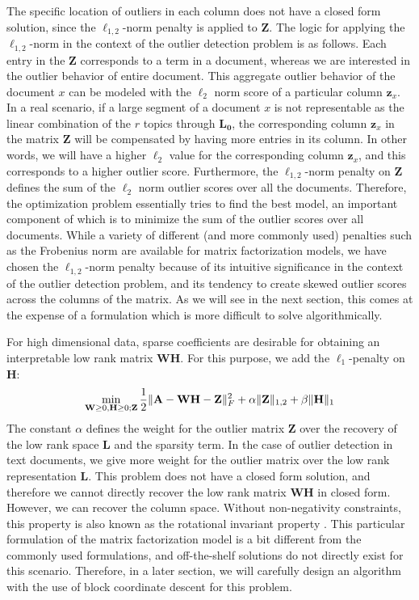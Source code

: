 The specific location of outliers in each column does not have a
closed form solution, since the $\ell_{1,2}$-norm penalty is applied
to $\mathbf{Z}$.   The   logic for applying the $\ell_{1,2}$-norm in
the context of the outlier detection problem is as follows.  Each
entry in the $\mathbf{Z}$ corresponds to a term in a document,
whereas we are interested in the outlier behavior of entire
document. This aggregate outlier behavior of the document $x$ can
be modeled with the $\ell_2$ norm score of a particular column
$\mathbf{z}_x$. In a real scenario,  if a large segment  of a
document $x$ is not representable as the linear combination of the
$r$ topics through $\mathbf{L_0}$, the corresponding column
$\mathbf{z}_x$ in the matrix $\mathbf{Z}$ will be compensated by
having more entries in its column.  In other words, we will  have a
higher $\ell_2$ value for the corresponding column $\mathbf{z}_x$,
and this corresponds to a higher outlier score.
 Furthermore, the  $\ell_{1,2}$-norm penalty on $\mathbf{Z}$
defines the sum of the $\ell_2$ norm outlier scores over all the
documents.  Therefore,  the optimization problem essentially tries
to find the best model,  an important component of which is to
minimize the sum of the outlier scores over all documents.  While a
variety of different  (and more commonly used) penalties such as the
Frobenius norm are available for matrix factorization models, we
have chosen the $\ell_{1,2}$-norm penalty because of its intuitive
significance in the context of the outlier detection problem, and
its tendency to create skewed outlier scores across the columns of
the matrix. As we will see in the next section, this comes at the
expense of a formulation which is more difficult to solve
algorithmically.

For high dimensional data, sparse coefficients are desirable for
obtaining an interpretable low rank matrix $\mathbf{W}\mathbf{H}$.
For this purpose, we add the $\ell_1$-penalty on $\mathbf{H}$:
\begin{equation}\label{outlier}
\min_{\mathbf{W}\ge0,\mathbf{H}\ge0; \mathbf{Z}}  \frac{1}{2}\|\mathbf{A}-\mathbf{W}\mathbf{H}-\mathbf{Z}\|_F^2 + \alpha\|\mathbf{Z}\|_{1,2} + \beta\|\mathbf{H}\|_{1}
\end{equation}
 The constant $\alpha$ defines the weight
for the outlier matrix $\mathbf{Z}$ over the recovery of the low
rank space $\mathbf{L}$ and the sparsity term. In the case of
outlier detection in text documents, we give more weight for the
outlier matrix over the low rank representation $\mathbf{L}$. This
problem does not have a closed form solution, and
 therefore we cannot  directly recover the low rank
matrix $\mathbf{W}\mathbf{H}$ in closed form. However, we can
recover the column space. Without non-negativity constraints, this
property is also known as the rotational invariant property
\cite{ding06,xu12}. This particular formulation of the matrix
factorization model is a bit different from the commonly used
formulations, and off-the-shelf solutions do not directly exist for
this scenario. Therefore, in a later section, we will carefully
design an algorithm with the use of block coordinate descent for
this problem.

